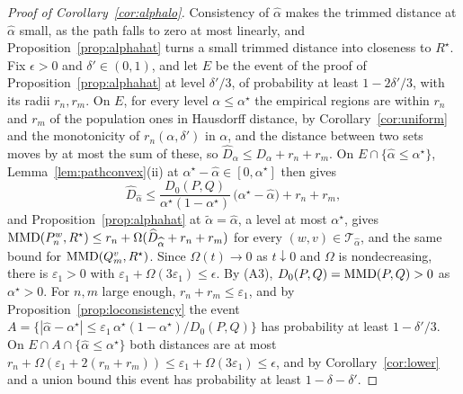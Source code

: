 \begin{proof}[Proof of Corollary~\ref{cor:alphalo}]
Consistency of $\widehat\alpha$ makes the trimmed distance at $\widehat\alpha$ small, as the path falls to zero at most
linearly, and Proposition~\ref{prop:alphahat} turns a small trimmed distance into closeness to $R^\star$. Fix
$\epsilon>0$ and $\delta'\in(0,1)$, and let $E$ be the event of the proof of Proposition~\ref{prop:alphahat} at
level $\delta'/3$, of probability at least $1-2\delta'/3$, with its radii $r_n,r_m$. On $E$, for every level
$\alpha\le\alpha^\star$ the empirical regions are within $r_n$ and $r_m$ of the population ones in Hausdorff distance,
by Corollary~\ref{cor:uniform} and the monotonicity of $r_n(\alpha,\delta')$ in $\alpha$, and the distance between two
sets moves by at most the sum of these, so $\widehat D_\alpha\le D_\alpha+r_n+r_m$. On $E\cap\{\widehat\alpha\le\alpha^\star\}$,
Lemma~\ref{lem:pathconvex}(ii) at $\alpha^\star-\widehat\alpha\in[0,\alpha^\star]$ then gives
\[
\widehat D_{\widehat\alpha}\le\frac{D_0(P,Q)}{\alpha^\star(1-\alpha^\star)}\,
\big(\alpha^\star-\widehat\alpha\big)+r_n+r_m ,
\]
and Proposition~\ref{prop:alphahat} at $\tilde\alpha=\widehat\alpha$, a level at most $\alpha^\star$,
gives $\operatorname{MMD}(P_n^w,R^\star)\le r_n+\Omega(\widehat D_{\widehat\alpha}+r_n+r_m)$ for every
$(w,v)\in\mathcal T_{\widehat\alpha}$, and the same bound for $\operatorname{MMD}(Q_m^v,R^\star)$. Since
$\Omega(t)\to0$ as $t\downarrow0$ and $\Omega$ is nondecreasing, there is $\varepsilon_1>0$ with $\varepsilon_1+\Omega(3\varepsilon_1)\le\epsilon$. By
(A3), $D_0(P,Q)=\operatorname{MMD}(P,Q)>0$ as $\alpha^\star>0$. For $n,m$ large enough, $r_n+r_m\le\varepsilon_1$, and by
Proposition~\ref{prop:loconsistency} the event
$A=\{|\widehat\alpha-\alpha^\star|\le\varepsilon_1\,\alpha^\star(1-\alpha^\star)/D_0(P,Q)\}$ has probability at least
$1-\delta'/3$. On $E\cap A\cap\{\widehat\alpha\le\alpha^\star\}$ both distances are at most
$r_n+\Omega(\varepsilon_1+2(r_n+r_m))\le\varepsilon_1+\Omega(3\varepsilon_1)\le\epsilon$, and by Corollary~\ref{cor:lower} and a union bound this event has
probability at least $1-\delta-\delta'$.
\end{proof}
